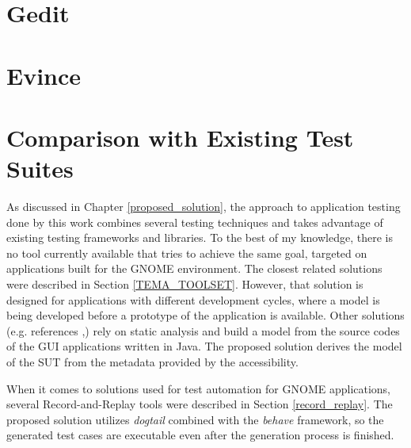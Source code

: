 \section{Gedit}
\section{Evince}\label{evince}

\section{Comparison with Existing Test Suites}\label{comparison}
As discussed in Chapter \ref{proposed_solution}, the approach to application testing done by this work combines several testing techniques and takes advantage of existing testing frameworks and libraries. To the best of my knowledge, there is no tool currently available that tries to achieve the same goal, targeted on applications built for the GNOME environment. The closest related solutions were described in Section \ref{TEMA_TOOLSET}. However, that solution is designed for applications with different development cycles, where a model is being developed before a prototype of the application is available. Other solutions (e.g. references \cite{ReisJacinto2018Aetw},\cite{ArltS2012LSAf}) rely on static analysis and build a model from the source codes of the GUI applications written in Java. The proposed solution derives the model of the SUT from the metadata provided by the accessibility.

When it comes to solutions used for test automation for GNOME applications, several Record-and-Replay tools were described in Section \ref{record_replay}. The proposed solution utilizes \textit{dogtail} combined with the \textit{behave} framework, so the generated test cases are executable even after the generation process is finished.

